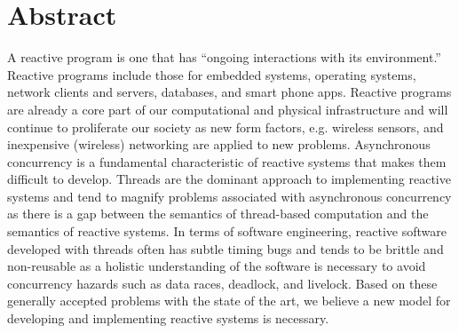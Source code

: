 \chapter*{Abstract}

A reactive program is one that has ``ongoing interactions with its environment\cite{manna1992temporal}.''
Reactive programs include those for embedded systems, operating systems, network clients and servers, databases, and smart phone apps.
Reactive programs are already a core part of our computational and physical infrastructure and will continue to proliferate our society as new form factors, e.g. wireless sensors, and inexpensive (wireless) networking are applied to new problems.
Asynchronous concurrency is a fundamental characteristic of reactive systems that makes them difficult to develop.
Threads are the dominant approach to implementing reactive systems and tend to magnify problems associated with asynchronous concurrency as there is a gap between the semantics of thread-based computation and the semantics of reactive systems.
In terms of software engineering, reactive software developed with threads often has subtle timing bugs and tends to be brittle and non-reusable as a holistic understanding of the software is necessary to avoid concurrency hazards such as data races, deadlock, and livelock.
Based on these generally accepted problems with the state of the art, we believe a new model for developing and implementing reactive systems is necessary.

